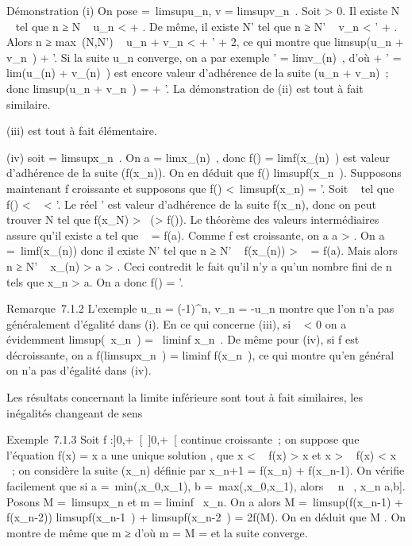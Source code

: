 \documentclass[]{article}
\begin{document}
Démonstration (i) On pose \ell =\
limsupu\_n, v = limsupv\_n~.
Soit \epsilon \textgreater{} 0. Il existe N \in {}~ tel que n ≥ N \rigtharrow~ u\_n
\textless{} \ell + \epsilon. De même, il existe N' tel que n ≥ N' \rigtharrow~ v\_n
\textless{} \ell' + \epsilon. Alors n ≥ max~(N,N') \rigtharrow~
u\_n + v\_n \textless{} \ell + \ell' + 2\epsilon, ce qui montre que
limsup(u\_n + v\_n~) \leq \ell + \ell'.
Si la suite u\_n converge, on a par exemple \ell'
= limv\_\phi(n)~, d'où \ell + \ell'
= lim(u\_\phi(n) + v\_\phi(n)~) est
encore valeur d'adhérence de la suite (u\_n + v\_n)~;
donc limsup(u\_n + v\_n~) = \ell +
\ell'. La démonstration de (ii) est tout à fait similaire.

(iii) est tout à fait élémentaire.

(iv) soit \ell = limsupx\_n~. On a \ell
= limx\_\phi(n)~, donc f(\ell)
= limf(x\_\phi(n)~) est valeur d'adhérence
de la suite (f(x\_n)). On en déduit que f(\ell)
\leq limsupf(x\_n~). Supposons maintenant
f croissante et supposons que f(\ell) \textless{}\
limsupf(x\_n) = \ell'. Soit \alpha~ tel que f(\ell) \textless{} \alpha~
\textless{} \ell'. Le réel \ell' est valeur d'adhérence de la suite
f(x\_n), donc on peut trouver N tel que f(x\_N)
\textgreater{} \alpha~(\textgreater{} f(\ell)). Le théorème des valeurs
intermédiaires assure qu'il existe a tel que \alpha~ = f(a). Comme f est
croissante, on a a \textgreater{} \ell. On a \ell =\
limf(x\_\phi(n)) donc il existe N' tel que n ≥ N' \rigtharrow~
f(x\_\phi(n)) \textgreater{} \alpha~ = f(a). Mais alors n ≥ N' \rigtharrow~
x\_\phi(n) \textgreater{} a \textgreater{} \ell. Ceci contredit le
fait qu'il n'y a qu'un nombre fini de n tels que x\_n
\textgreater{} a. On a donc f(\ell) = \ell'.

Remarque~7.1.2 L'exemple u\_n = (-1)^n, v\_n
= -u\_n montre que l'on n'a pas généralement d'égalité dans (i).
En ce qui concerne (iii), si \lambda~ \textless{} 0 on a évidemment
limsup(\lambda~x\_n~) =
\lambda~liminf x\_n~. De même pour (iv), si f
est décroissante, on a f(limsupx\_n~)
= liminf f(x\_n~), ce qui montre qu'en
général on n'a pas d'égalité dans (iv).

Les résultats concernant la limite inférieure sont tout à fait
similaires, les inégalités changeant de sens

Exemple~7.1.3 Soit f :{]}0,+\infty~{[}\rightarrow~{]}0,+\infty~{[} continue croissante~; on
suppose que l'équation f(x) = x  a une unique
solution \ell, que x \textless{} \ell \rigtharrow~ f(x) \textgreater{} x
\over 2 et x \textgreater{} \ell \rigtharrow~ f(x) \textless{} x
\over 2 ~; on considère la suite (x\_n) définie
par x\_n+1 = f(x\_n) + f(x\_n-1). On vérifie
facilement que si a =\
min(\ell,x\_0,x\_1), b =\
max(\ell,x\_0,x\_1), alors \forall~~n \in
\mathbb{N}~, x\_n \in {[}a,b{]}. Posons M =\
limsupx\_n et m = liminf~
x\_n. On a alors M =\
limsup(f(x\_n-1) + f(x\_n-2))
\leq limsupf(x\_n-1~)
+ limsupf(x\_n-2~) = 2f(M). On en
déduit que M \leq \ell. On montre de même que m ≥ \ell d'où m = M = \ell et la suite
converge.
\end{document}
